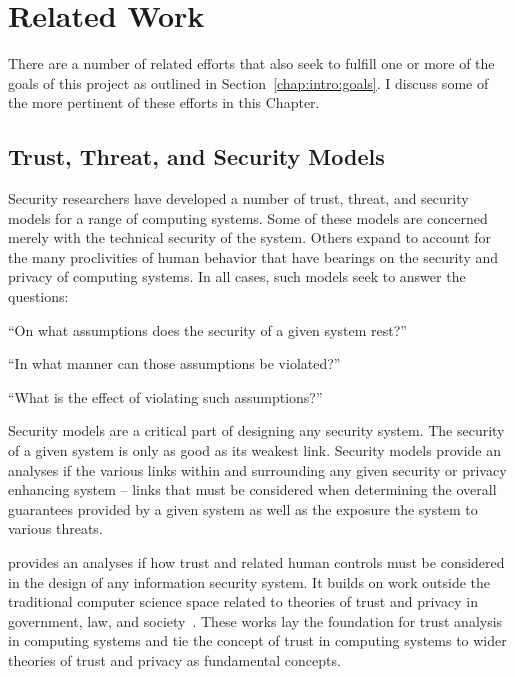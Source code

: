 \chapter{Related Work}
\label{chap:related}

There are a number of related efforts that also seek to fulfill one or
more of the goals of this project as outlined in
Section~\ref{chap:intro:goals}. I discuss some of the more pertinent
of these efforts in this Chapter.

\section{Trust, Threat, and Security Models}
\label{chap:related:models}

Security researchers have developed a number of trust, threat, and
security models for a range of computing systems. Some of these models
are concerned merely with the technical security of the system. Others
expand to account for the many proclivities of human behavior that
have bearings on the security and privacy of computing systems. In all
cases, such models seek to answer the questions:

\begin{packed_item}
\item ``On what assumptions does the security of a given system rest?''
\item ``In what manner can those assumptions be violated?''
\item ``What is the effect of violating such assumptions?''
\end{packed_item}

Security models are a critical part of designing any security
system. The security of a given system is only as good as its weakest
link. Security models provide an analyses if the various links within
and surrounding any given security or privacy enhancing system --
links that must be considered when determining the overall guarantees
provided by a given system as well as the exposure the system to
various threats.

\cite{flowerday2006} provides an analyses if how trust and related
human controls must be considered in the design of any information
security system. It builds on work outside the traditional computer
science space related to theories of trust and privacy in government,
law, and society~\cite{camp2003}. These works lay the foundation for
trust analysis in computing systems and tie the concept of trust in
computing systems to wider theories of trust and privacy as
fundamental concepts.

